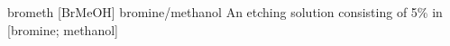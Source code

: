 \newglsXchemical%
{brometh}%
[BrMeOH]%
{bromine/methanol}%
{}%
{An etching solution consisting of 5\%  in }%
[bromine; methanol]%